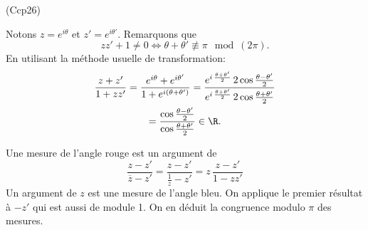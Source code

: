 \begin{tiny}(Ccp26)\end{tiny} Notons $z= e^{i \theta}$ et $z' = e^{i \theta'}$. Remarquons que 
\[
zz' + 1 \neq 0 
\Leftrightarrow
\theta + \theta' \not \equiv \pi \mod (2\pi).
\]
En utilisant la méthode usuelle de transformation:
\begin{multline*}
  \frac{z + z'}{1 + zz'}
  = \frac{e^{i \theta} + e^{i\theta'}}{1 + e^{i(\theta + \theta')}}
  = \frac{e^{i\, \frac{\theta + \theta'}{2}}\, 2 \cos \frac{\theta - \theta'}{2}}{e^{i\, \frac{\theta + \theta'}{2}}\, 2 \cos \frac{\theta + \theta'}{2}}\\
  = \frac{\cos \frac{\theta - \theta'}{2}}{\cos \frac{\theta + \theta'}{2}} \in \R.
\end{multline*}

Une mesure de l'angle rouge est un argument de
\[
  \frac{z-z'}{\overline{z}-z'}
  = \frac{z-z'}{\frac{1}{z}-z'}
  = z\, \frac{z - z' }{1-zz'}
\]
Un argument de $z$ est une mesure de l'angle bleu. On applique le premier résultat à $-z'$ qui est aussi de module 1. On en déduit la congruence modulo $\pi$ des mesures.
